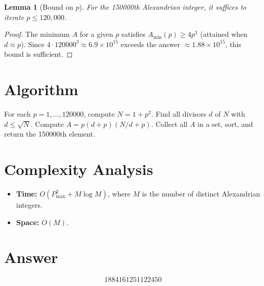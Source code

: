 \documentclass[12pt]{article}
\newtheorem{lemma}[theorem]{Lemma}
\begin{document}
\begin{lemma}[Bound on $p$]
For the 150000th Alexandrian integer, it suffices to iterate $p \leq 120{,}000$.
\end{lemma}
\begin{proof}
The minimum $A$ for a given $p$ satisfies $A_{\min}(p) \geq 4p^3$ (attained when $d \approx p$). Since $4 \cdot 120000^3 \approx 6.9 \times 10^{15}$ exceeds the answer $\approx 1.88 \times 10^{15}$, this bound is sufficient.
\end{proof}

\section{Algorithm}
For each $p = 1, \ldots, 120000$, compute $N = 1 + p^2$. Find all divisors $d$ of $N$ with $d \leq \sqrt{N}$. Compute $A = p(d+p)(N/d + p)$. Collect all $A$ in a set, sort, and return the 150000th element.

\section{Complexity Analysis}
\begin{itemize}
\item \textbf{Time:} $O(P_{\max}^2 + M \log M)$, where $M$ is the number of distinct Alexandrian integers.
\item \textbf{Space:} $O(M)$.
\end{itemize}

\section{Answer}

\[
\boxed{1884161251122450}
\]
\end{document}
